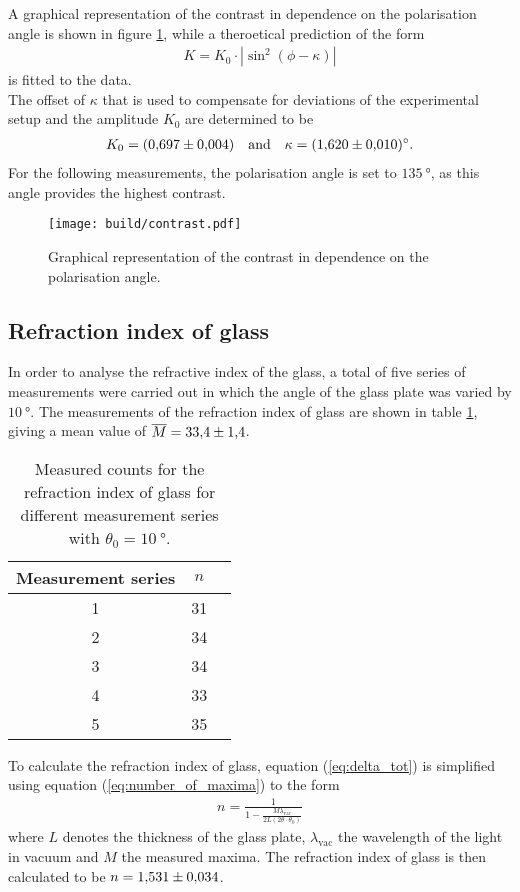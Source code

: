 \noindent
A graphical representation of the contrast in dependence on the polarisation angle is shown in figure \ref{fig:contrast}, while a theroetical prediction of the form
\begin{align}
    K = K_0\cdot|\sin^2(\phi-\kappa)|
\end{align}
is fitted to the data.\\
The offset of $\kappa$ that is used to compensate for deviations of the experimental setup and the amplitude $K_0$ are determined to be
\begin{align*}
    K_0=\SI{0.697\pm0.004}{} \quad \text{and} \quad \kappa=\SI{1.620\pm0.010}{\degree}.
\end{align*}
For the following measurements, the polarisation angle is set to $\SI{135}{\degree}$, as this angle provides the highest contrast.
\begin{figure}[H]
    \centering
    \texttt{[image: build/contrast.pdf]}
    \caption{Graphical representation of the contrast in dependence on the polarisation angle.}
    \label{fig:contrast}
\end{figure}

\subsection{Refraction index of glass}
\label{subsec:refraction_glass}

In order to analyse the refractive index of the glass, a total of five series of measurements were carried out in which the angle of the glass plate was varied by $\SI{10}{\degree}$.
The measurements of the refraction index of glass are shown in table \ref{tab:refraction_glass}, giving a mean value of $\overline M=\num{33.4\pm1.4}$.
\begin{table}[H]
    \centering
    \begin{tabular}{c c c}
        \toprule
        Measurement series & $n$ \\
        \midrule
        1 & 31 \\
        2 & 34 \\
        3 & 34 \\
        4 & 33 \\
        5 & 35 \\
        \bottomrule
    \end{tabular}
    \caption{Measured counts for the refraction index of glass for different measurement series with $\theta_0=\SI{10}{\degree}$.}
    \label{tab:refraction_glass}
\end{table}
\noindent
To calculate the refraction index of glass, equation (\ref{eq:delta_tot}) is simplified using equation (\ref{eq:number_of_maxima}) to the form
\begin{align}
    n = \frac{1}{1-\frac{M\lambda_{\text{vac}}}{2 L(2\theta \cdot \theta_0)}}
\end{align}
where $L$ denotes the thickness of the glass plate, $\lambda_\text{vac}$ the wavelength of the light in vacuum and $M$ the measured maxima.
The refraction index of glass is then calculated to be $n=\num{1.531 \pm 0.034}$.

